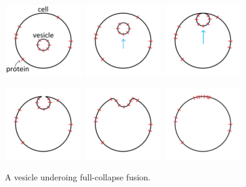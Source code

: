 \documentclass{report}
\begin{document}
\begin{figure}
	\centering

	\includegraphics[width = 0.3\textwidth]{fc_fusion/2vesicle.png}
	\includegraphics[width = 0.3\textwidth]{fc_fusion/3transport.png}
	\includegraphics[width = 0.3\textwidth]{fc_fusion/4dock.png}

	\includegraphics[width = 0.3\textwidth]{fc_fusion/5pore.png}
	\includegraphics[width = 0.3\textwidth]{fc_fusion/6bend.png}
	\includegraphics[width = 0.3\textwidth]{fc_fusion/7conform.png}

	\caption{A vesicle underoing full-collapse fusion.}
	\label{fig:full_collapse_fusion_multiples}
\end{figure}
\end{document}
